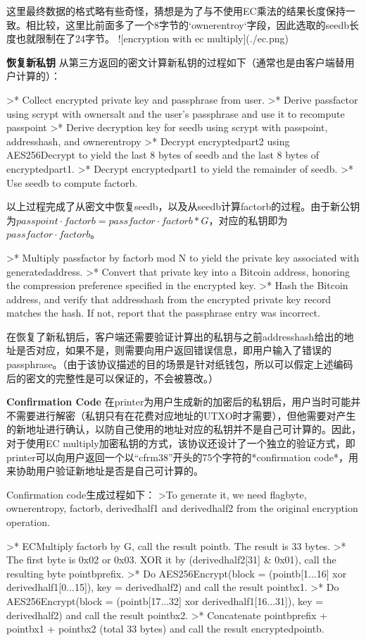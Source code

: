 \documentclass{article}
\begin{document}
这里最终数据的格式略有些奇怪，猜想是为了与不使用EC乘法的结果长度保持一致。相比较，这里比前面多了一个8字节的`ownerentroy`字段，因此选取的seedb长度也就限制在了24字节。
![encryption with ec multiply](./ec.png)

\textbf{恢复新私钥}
从第三方返回的密文计算新私钥的过程如下（通常也是由客户端替用户计算的）：

>* Collect encrypted private key and passphrase from user.
>* Derive passfactor using scrypt with ownersalt and the user's passphrase and use it to recompute passpoint
>* Derive decryption key for seedb using scrypt with passpoint, addresshash, and ownerentropy
>* Decrypt encryptedpart2 using AES256Decrypt to yield the last 8 bytes of seedb and the last 8 bytes of encryptedpart1.
>* Decrypt encryptedpart1 to yield the remainder of seedb.
>* Use seedb to compute factorb.

以上过程完成了从密文中恢复seedb，以及从seedb计算factorb的过程。由于新公钥为$passpoint\cdot factorb=passfactor\cdot factorb *G$，对应的私钥即为$passfactor\cdot factorb$。

>* Multiply passfactor by factorb mod N to yield the private key associated with generatedaddress.
>* Convert that private key into a Bitcoin address, honoring the compression preference specified in the encrypted key.
>* Hash the Bitcoin address, and verify that addresshash from the encrypted private key record matches the hash. If not, report that the passphrase entry was incorrect.

在恢复了新私钥后，客户端还需要验证计算出的私钥与之前addresshash给出的地址是否对应，如果不是，则需要向用户返回错误信息，即用户输入了错误的passphrase。（由于该协议描述的目的场景是针对纸钱包，所以可以假定上述编码后的密文的完整性是可以保证的，不会被篡改。）

\textbf{ Confirmation Code}
在printer为用户生成新的加密后的私钥后，用户当时可能并不需要进行解密（私钥只有在花费对应地址的UTXO时才需要），但他需要对产生的新地址进行确认，以防自己使用的地址对应的私钥并不是自己可计算的。因此，对于使用EC multiply加密私钥的方式，该协议还设计了一个独立的验证方式，即printer可以向用户返回一个以“cfrm38”开头的75个字符的*confirmation code*，用来协助用户验证新地址是否是自己可计算的。
 
Confirmation code生成过程如下：
>To generate it, we need flagbyte, ownerentropy, factorb, derivedhalf1 and derivedhalf2 from the original encryption operation.

>* ECMultiply factorb by G, call the result pointb. The result is 33 bytes.
>* The first byte is 0x02 or 0x03. XOR it by (derivedhalf2[31] \& 0x01), call the resulting byte pointbprefix.
>* Do AES256Encrypt(block = (pointb[1...16] xor derivedhalf1[0...15]), key = derivedhalf2) and call the result pointbx1.
>* Do AES256Encrypt(block = (pointb[17...32] xor derivedhalf1[16...31]), key = derivedhalf2) and call the result pointbx2.
>* Concatenate pointbprefix + pointbx1 + pointbx2 (total 33 bytes) and call the result encryptedpointb.  
\end{document}
